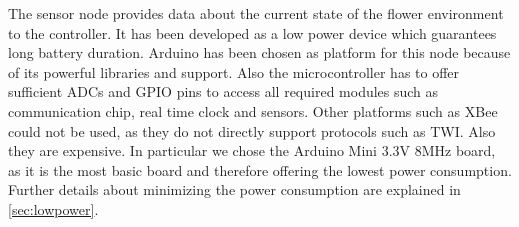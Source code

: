 
The sensor node provides data about the current state of the flower environment to the controller.
It has been developed as a low power device which guarantees long battery duration.
Arduino has been chosen as platform for this node because of its powerful libraries and support. Also the microcontroller has to offer sufficient ADCs and GPIO pins to access all required modules such as communication chip, real time clock and sensors. Other platforms such as XBee could not be used, as they do not directly support protocols such as TWI. Also they are expensive.
In particular we chose the Arduino Mini 3.3V 8MHz board, as it is the most basic board and therefore offering the lowest power consumption. Further details about minimizing the power consumption are explained in \ref{sec:lowpower}.



